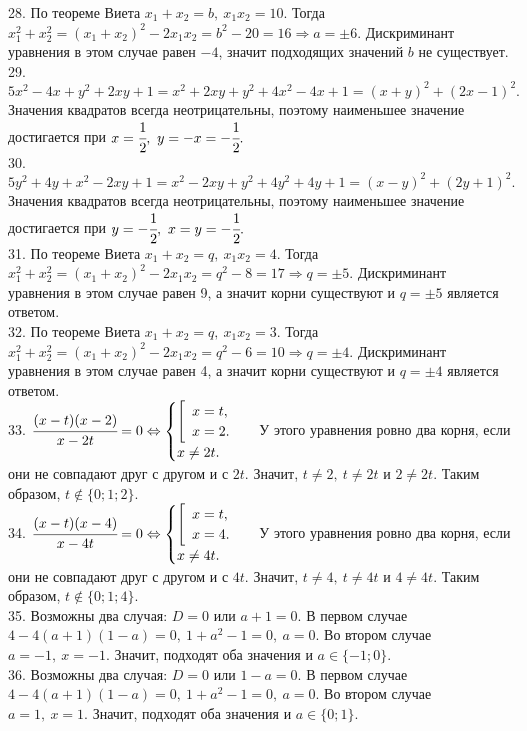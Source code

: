 28. По теореме Виета $x_1+x_2=b,\ x_1x_2=10.$ Тогда $x_1^2+x_2^2=(x_1+x_2)^2-2x_1x_2=b^2-20=16\Rightarrow a=\pm6.$ Дискриминант уравнения в этом случае равен $-4$, значит подходящих значений $b$ не существует.\\
29. $5x^2-4x+y^2+2xy+1=x^2+2xy+y^2+4x^2-4x+1=(x+y)^2+(2x-1)^2.$ Значения квадратов всегда неотрицательны, поэтому наименьшее значение достигается при $x=\cfrac{1}{2},\ y=-x=-\cfrac{1}{2}.$\\
30. $5y^2+4y+x^2-2xy+1=x^2-2xy+y^2+4y^2+4y+1=(x-y)^2+(2y+1)^2.$ Значения квадратов всегда неотрицательны, поэтому наименьшее значение достигается при $y=-\cfrac{1}{2},\ x=y=-\cfrac{1}{2}.$\\
31. По теореме Виета $x_1+x_2=q,\ x_1x_2=4.$ Тогда $x_1^2+x_2^2=(x_1+x_2)^2-2x_1x_2=q^2-8=17\Rightarrow q=\pm5.$ Дискриминант уравнения в этом случае равен 9, а значит корни существуют и $q=\pm5$ является ответом.\\
32. По теореме Виета $x_1+x_2=q,\ x_1x_2=3.$ Тогда $x_1^2+x_2^2=(x_1+x_2)^2-2x_1x_2=q^2-6=10\Rightarrow q=\pm4.$ Дискриминант уравнения в этом случае равен 4, а значит корни существуют и $q=\pm4$ является ответом.\\
33. $\cfrac{(x-t)(x-2)}{x-2t}=0\Leftrightarrow\begin{cases}\left[\begin{array}{l}x=t,\\ x=2.\end{array}\right.\\x\neq2t.\end{cases}$ У этого уравнения ровно два корня, если они не совпадают друг с другом и с $2t.$ Значит, $t\neq2,\ t\neq2t$ и $2\neq2t.$ Таким образом, $t\notin\{0; 1; 2\}.$\\
34. $\cfrac{(x-t)(x-4)}{x-4t}=0\Leftrightarrow\begin{cases}\left[\begin{array}{l}x=t,\\ x=4.\end{array}\right.\\x\neq4t.\end{cases}$ У этого уравнения ровно два корня, если они не совпадают друг с другом и с $4t.$ Значит, $t\neq4,\ t\neq4t$ и $4\neq4t.$ Таким образом, $t\notin\{0; 1; 4\}.$\\
35. Возможны два случая: $D=0$ или $a+1=0.$ В первом случае $4-4(a+1)(1-a)=0,\ 1+a^2-1=0,\ a=0.$ Во втором случае $a=-1,\ x=-1.$ Значит, подходят оба значения и $a\in\{-1;0\}.$\\
36. Возможны два случая: $D=0$ или $1-a=0.$ В первом случае $4-4(a+1)(1-a)=0,\ 1+a^2-1=0,\ a=0.$ Во втором случае $a=1,\ x=1.$ Значит, подходят оба значения и $a\in\{0;1\}.$\\
